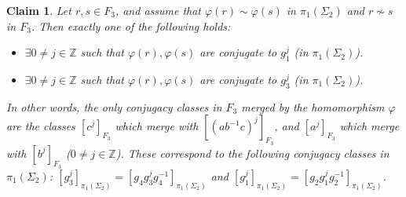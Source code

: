 \documentclass[11pt]{article}
\newtheorem{claim}[theorem]{Claim}
\newcommand{\Z}{\mathbb{Z}}
\begin{document}
    \begin{claim}\label{cl:1}
    Let $r,s \in F_3$, and assume that $\varphi(r) \sim \varphi(s)$ in $\pi_1(\Sigma_2)$ and $r \not\sim s$ in $F_3$. Then exactly one of the following holds:
    \begin{itemize}
        \item $\exists 0 \neq j \in \Z$ such that $\varphi(r),\varphi(s)$ are conjugate to $g_1^j$ (in $\pi_1(\Sigma_2)$).
        \item $\exists 0 \neq j \in \Z$ such that $\varphi(r),\varphi(s)$ are conjugate to $g_3^j$ (in $\pi_1(\Sigma_2)$).
    \end{itemize}
    
    In other words, the only conjugacy classes in $F_3$ merged by the homomorphism $\varphi$ are the classes $[c^j]_{F_3}$ which merge with $[(ab^{-1}c)^j]_{F_3}$, and $[a^j]_{F_3}$ which merge with $[b^j]_{F_3}$ ($0 \neq j \in \Z$). These correspond to the following conjugacy classes in $\pi_1(\Sigma_2)$: $[g_3^j]_{\pi_1(\Sigma_2)} = [g_4 g_3^j g_4^{-1}]_{\pi_1(\Sigma_2)}$ and $[g_1^j]_{\pi_1(\Sigma_2)} = [g_2 g_1^j g_2^{-1}]_{\pi_1(\Sigma_2)}$.
    \end{claim}
    
\end{document}
